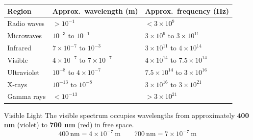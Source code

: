 \begin{center}


\end{center}

\begin{center}
\renewcommand{\arraystretch}{1.4}
\begin{tabular}{@{} l l l @{}}
\toprule
\textbf{Region} & \textbf{Approx.\ wavelength (m)} & \textbf{Approx.\ frequency (Hz)} \\
\midrule
Radio waves      & $> 10^{-1}$               & $< 3\times10^{9}$ \\
Microwaves       & $10^{-3}$ to $10^{-1}$    & $3\times10^{9}$ to $3\times10^{11}$ \\
Infrared         & $7\times10^{-7}$ to $10^{-3}$ & $3\times10^{11}$ to $4\times10^{14}$ \\
Visible          & $4\times10^{-7}$ to $7\times10^{-7}$ & $4\times10^{14}$ to $7.5\times10^{14}$ \\
Ultraviolet      & $10^{-8}$ to $4\times10^{-7}$ & $7.5\times10^{14}$ to $3\times10^{16}$ \\
X-rays           & $10^{-13}$ to $10^{-8}$   & $3\times10^{16}$ to $3\times10^{21}$ \\
Gamma rays       & $< 10^{-13}$              & $> 3\times10^{21}$ \\
\bottomrule
\end{tabular}
\end{center}

\begin{keybox}{Visible Light}
The visible spectrum occupies wavelengths from approximately \textbf{400 nm} (violet) to \textbf{700 nm} (red) in free space.
$$400\ \text{nm} = 4\times10^{-7}\ \text{m} \qquad 700\ \text{nm} = 7\times10^{-7}\ \text{m}$$
\end{keybox}

